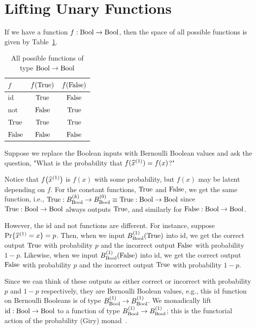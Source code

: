 \documentclass[../main.tex]{subfiles}
\begin{document}
\section{Lifting Unary Functions}

If we have a function $f : \mathrm{Bool} \to \mathrm{Bool}$, then the space of all possible functions is given by Table~\ref{tbl:bool_functions}.

\begin{table}[htbp]
\centering
\caption{All possible functions of type $\mathrm{Bool} \to \mathrm{Bool}$}
\label{tbl:bool_functions}
\begin{tabular}{@{}lcc@{}}
\toprule
$f$ & $f(\mathrm{True})$ & $f(\mathrm{False})$ \\
\midrule
$\mathrm{id}$ & $\mathrm{True}$ & $\mathrm{False}$ \\
$\mathrm{not}$ & $\mathrm{False}$ & $\mathrm{True}$ \\
$\mathrm{True}$ & $\mathrm{True}$ & $\mathrm{True}$ \\
$\mathrm{False}$ & $\mathrm{False}$ & $\mathrm{False}$ \\
\bottomrule
\end{tabular}
\end{table}

Suppose we replace the Boolean inputs with Bernoulli Boolean values and ask the question, "What is the probability that $f(\widehat{x}^{(1)}) = f(x)$?"

Notice that $f\bigl(\widehat{x}^{(1)}\bigr)$ is $f(x)$ with some probability, but $f(x)$ may be latent depending on $f$. For the constant functions, $\mathrm{True}$ and $\mathrm{False}$, we get the same function, i.e., $\mathrm{True} : B_{\mathrm{Bool}}^{(k)} \to B_{\mathrm{Bool}}^{(0)} \equiv \mathrm{True} : \mathrm{Bool} \to \mathrm{Bool}$ since $\mathrm{True} : \mathrm{Bool} \to \mathrm{Bool}$ always outputs $\mathrm{True}$, and similarly for $\mathrm{False} : \mathrm{Bool} \to \mathrm{Bool}$.

However, the $\mathrm{id}$ and $\mathrm{not}$ functions are different. For instance, suppose $\Pr\{\widehat{x}^{(1)} = x\} = p$. Then, when we input $B_{\mathrm{Bool}}^{(1)}(\mathrm{True})$ into $\mathrm{id}$, we get the correct output $\mathrm{True}$ with probability $p$ and the incorrect output $\mathrm{False}$ with probability $1-p$. Likewise, when we input $B_{\mathrm{Bool}}^{(1)}(\mathrm{False})$ into $\mathrm{id}$, we get the correct output $\mathrm{False}$ with probability $p$ and the incorrect output $\mathrm{True}$ with probability $1-p$.

Since we can think of these outputs as either correct or incorrect with probability $p$ and $1-p$ respectively, they are Bernoulli Boolean values, e.g., this $\mathrm{id}$ function on Bernoulli Booleans is of type $B_{\mathrm{Bool}}^{(1)} \to B_{\mathrm{Bool}}^{(1)}$. We monadically lift $\mathrm{id} : \mathrm{Bool} \to \mathrm{Bool}$ to a function of type $B_{\mathrm{Bool}}^{(1)} \to B_{\mathrm{Bool}}^{(1)}$; this is the functorial action of the probability (Giry) monad~\cite{giry1982categorical,ramsey2002stochastic}.
\end{document}
